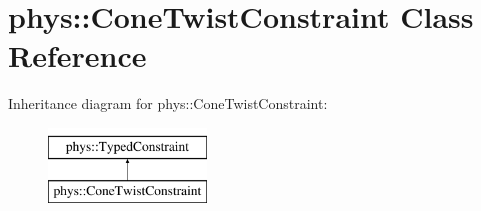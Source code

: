 \hypertarget{classphys_1_1ConeTwistConstraint}{
\section{phys::ConeTwistConstraint Class Reference}
\label{da/dbc/classphys_1_1ConeTwistConstraint}
}
Inheritance diagram for phys::ConeTwistConstraint:\begin{figure}[H]
\begin{center}
\leavevmode
\includegraphics[height=2.000000cm]{da/dbc/classphys_1_1ConeTwistConstraint}
\end{center}
\end{figure}
